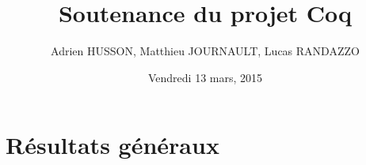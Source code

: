 \documentclass[10pt,xcolor={usenames,dvipsnames,svgnames,table}]{beamer}
\author{Adrien HUSSON, Matthieu JOURNAULT, Lucas RANDAZZO}
\date{Vendredi 13 mars, 2015}
\title{Soutenance du projet Coq}
\begin{document}
  \maketitle
  \begin{frame}
    \tableofcontents
  \end{frame}
  \section{Résultats généraux}
  
  
\end{document}
